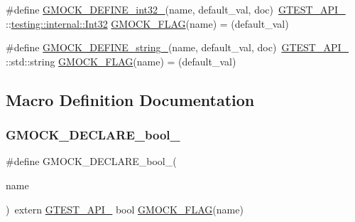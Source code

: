 \begin{DoxyCompactItemize}
\item 
\#define \mbox{\hyperlink{googletest-master_2googlemock_2include_2gmock_2internal_2gmock-port_8h_a19d91081ff0aaab2f60ef1dc2d6e6b34}{G\+M\+O\+C\+K\+\_\+\+D\+E\+F\+I\+N\+E\+\_\+int32\+\_\+}}(name,  default\+\_\+val,  doc)~\mbox{\hyperlink{_obj__test_2lib_2googletest-release-1_88_81_2googletest_2include_2gtest_2internal_2gtest-port_8h_aa73be6f0ba4a7456180a94904ce17790}{G\+T\+E\+S\+T\+\_\+\+A\+P\+I\+\_\+}} \+::\mbox{\hyperlink{namespacetesting_1_1internal_af89e21e4043b5cf0c120af487b24fa06}{testing\+::internal\+::\+Int32}} \mbox{\hyperlink{_obj__test_2lib_2googletest-release-1_88_81_2googlemock_2include_2gmock_2internal_2gmock-port_8h_ad7119adfef06be5e7b1551633f5a1436}{G\+M\+O\+C\+K\+\_\+\+F\+L\+AG}}(name) = (default\+\_\+val)
\item 
\#define \mbox{\hyperlink{googletest-master_2googlemock_2include_2gmock_2internal_2gmock-port_8h_ad6badbf90e5a813e2bd5668fc6b6a8f7}{G\+M\+O\+C\+K\+\_\+\+D\+E\+F\+I\+N\+E\+\_\+string\+\_\+}}(name,  default\+\_\+val,  doc)~\mbox{\hyperlink{_obj__test_2lib_2googletest-release-1_88_81_2googletest_2include_2gtest_2internal_2gtest-port_8h_aa73be6f0ba4a7456180a94904ce17790}{G\+T\+E\+S\+T\+\_\+\+A\+P\+I\+\_\+}} \+::std\+::string \mbox{\hyperlink{_obj__test_2lib_2googletest-release-1_88_81_2googlemock_2include_2gmock_2internal_2gmock-port_8h_ad7119adfef06be5e7b1551633f5a1436}{G\+M\+O\+C\+K\+\_\+\+F\+L\+AG}}(name) = (default\+\_\+val)
\end{DoxyCompactItemize}


\subsection{Macro Definition Documentation}
\mbox{\label{googletest-master_2googlemock_2include_2gmock_2internal_2gmock-port_8h_a7a0a953221ea8ef5aaa6c644a48af599}} 
\subsubsection{\texorpdfstring{GMOCK\_DECLARE\_bool\_}{GMOCK\_DECLARE\_bool\_}}
{\footnotesize\ttfamily \#define G\+M\+O\+C\+K\+\_\+\+D\+E\+C\+L\+A\+R\+E\+\_\+bool\+\_\+(\begin{DoxyParamCaption}\item[{}]{name }\end{DoxyParamCaption})~extern \mbox{\hyperlink{_obj__test_2lib_2googletest-release-1_88_81_2googletest_2include_2gtest_2internal_2gtest-port_8h_aa73be6f0ba4a7456180a94904ce17790}{G\+T\+E\+S\+T\+\_\+\+A\+P\+I\+\_\+}} bool \mbox{\hyperlink{_obj__test_2lib_2googletest-release-1_88_81_2googlemock_2include_2gmock_2internal_2gmock-port_8h_ad7119adfef06be5e7b1551633f5a1436}{G\+M\+O\+C\+K\+\_\+\+F\+L\+AG}}(name)}

